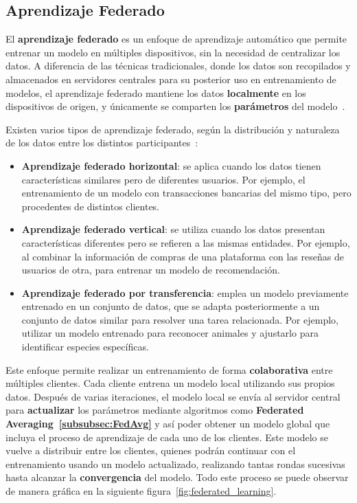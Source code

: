 \subsection{Aprendizaje Federado}
\label{subsec:AprendizajeFederado}
El \textbf{aprendizaje federado} es un enfoque de aprendizaje automático que permite entrenar un modelo en múltiples dispositivos, sin la necesidad de centralizar los datos. A diferencia de las técnicas tradicionales, donde los datos son recopilados y almacenados en servidores centrales para su posterior uso en entrenamiento de modelos, el aprendizaje federado mantiene los datos \textbf{localmente} en los dispositivos de origen, y únicamente se comparten los \textbf{parámetros} del modelo~\cite{aprendizaje_federado_video}.

Existen varios tipos de aprendizaje federado, según la distribución y naturaleza de los datos entre los distintos participantes~\cite{aprendizaje_federado_introduccion}:

\begin{itemize}
    \item \textbf{Aprendizaje federado horizontal}: se aplica cuando los datos tienen características similares pero de diferentes usuarios. Por ejemplo, el entrenamiento de un modelo con transacciones bancarias del mismo tipo, pero procedentes de distintos clientes.
    
    \item \textbf{Aprendizaje federado vertical}: se utiliza cuando los datos presentan características diferentes pero se refieren a las mismas entidades. Por ejemplo, al combinar la información de compras de una plataforma con las reseñas de usuarios de otra, para entrenar un modelo de recomendación.
    
    \item \textbf{Aprendizaje federado por transferencia}: emplea un modelo previamente entrenado en un conjunto de datos, que se adapta posteriormente a un conjunto de datos similar para resolver una tarea relacionada. Por ejemplo, utilizar un modelo entrenado para reconocer animales y ajustarlo para identificar especies específicas.
\end{itemize}

Este enfoque permite realizar un entrenamiento de forma \textbf{colaborativa} entre múltiples clientes. Cada cliente entrena un modelo local utilizando sus propios datos. Después de varias iteraciones, el modelo local se envía al servidor central para \textbf{actualizar} los parámetros mediante algoritmos como \textbf{Federated Averaging~\ref{subsubsec:FedAvg}} y así poder obtener un modelo global que incluya el proceso de aprendizaje de cada uno de los clientes. Este modelo se vuelve a distribuir entre los clientes, quienes podrán continuar con el entrenamiento usando un modelo actualizado, realizando tantas rondas sucesivas hasta alcanzar la \textbf{convergencia} del modelo. Todo este proceso se puede observar de manera gráfica en la siguiente figura~\ref{fig:federated_learning}.

